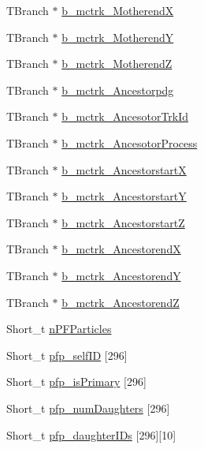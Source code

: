 \begin{DoxyCompactItemize}
\item 
T\-Branch $\ast$ \hyperlink{classanatree_abe5d7fc761462f24bc19c385c82ab0f7}{b\-\_\-mctrk\-\_\-\-Motherend\-X}
\item 
T\-Branch $\ast$ \hyperlink{classanatree_aca7ae13ef5e0c2905a3290829e17fa34}{b\-\_\-mctrk\-\_\-\-Motherend\-Y}
\item 
T\-Branch $\ast$ \hyperlink{classanatree_a19dbdc8b413c136c7341c2703da6ab35}{b\-\_\-mctrk\-\_\-\-Motherend\-Z}
\item 
T\-Branch $\ast$ \hyperlink{classanatree_a89c9b2b21369021a11f15b7302b74963}{b\-\_\-mctrk\-\_\-\-Ancestorpdg}
\item 
T\-Branch $\ast$ \hyperlink{classanatree_abb69fb4d422d41345116321e7dc65563}{b\-\_\-mctrk\-\_\-\-Ancesotor\-Trk\-Id}
\item 
T\-Branch $\ast$ \hyperlink{classanatree_a57271022de8f9780aaaaf7027e4c7b5f}{b\-\_\-mctrk\-\_\-\-Ancesotor\-Process}
\item 
T\-Branch $\ast$ \hyperlink{classanatree_aa1576290bbeadd14ab80189288e5bd19}{b\-\_\-mctrk\-\_\-\-Ancestorstart\-X}
\item 
T\-Branch $\ast$ \hyperlink{classanatree_a731b5b7ecb4f501a04d3fc431f0320f7}{b\-\_\-mctrk\-\_\-\-Ancestorstart\-Y}
\item 
T\-Branch $\ast$ \hyperlink{classanatree_a4ad6231b0306d661f34304b1ec76c6c9}{b\-\_\-mctrk\-\_\-\-Ancestorstart\-Z}
\item 
T\-Branch $\ast$ \hyperlink{classanatree_ac5e379867858a566db66f31f898069d5}{b\-\_\-mctrk\-\_\-\-Ancestorend\-X}
\item 
T\-Branch $\ast$ \hyperlink{classanatree_a0795fc8135b29e8a7e48fc30d1d3ad2e}{b\-\_\-mctrk\-\_\-\-Ancestorend\-Y}
\item 
T\-Branch $\ast$ \hyperlink{classanatree_a4564a08e43ba515f1bcf68b1d3a67017}{b\-\_\-mctrk\-\_\-\-Ancestorend\-Z}
\item 
Short\-\_\-t \hyperlink{classanatree_a84aeab1940e673c8cbeb0b299bce0e47}{n\-P\-F\-Particles}
\item 
Short\-\_\-t \hyperlink{classanatree_a34a89da6c6a771e3c58ba59188e71796}{pfp\-\_\-self\-I\-D} \mbox{[}296\mbox{]}
\item 
Short\-\_\-t \hyperlink{classanatree_ae82cf9f0d4d425081d40172ae08dd058}{pfp\-\_\-is\-Primary} \mbox{[}296\mbox{]}
\item 
Short\-\_\-t \hyperlink{classanatree_ad8983a7e06fffa7b3b48e9d52fd6e91a}{pfp\-\_\-num\-Daughters} \mbox{[}296\mbox{]}
\item 
Short\-\_\-t \hyperlink{classanatree_aa655f722e9ce82107fcd8db68c819b7e}{pfp\-\_\-daughter\-I\-Ds} \mbox{[}296\mbox{]}\mbox{[}10\mbox{]}

\end{DoxyCompactItemize}
